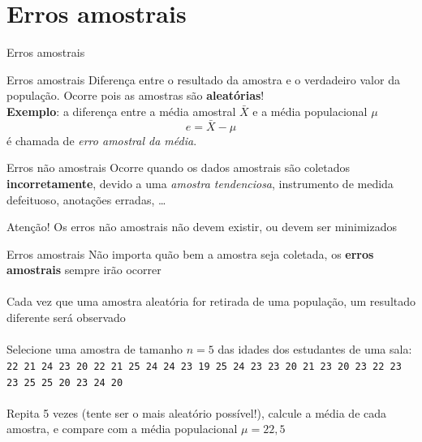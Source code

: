 \documentclass[10pt]{beamer}\usepackage[]{graphicx}\usepackage[]{color}
\theoremstyle{definition}
\begin{document}
\section{Erros amostrais}

\begin{frame}{Erros amostrais}
  \begin{block}{Erros amostrais}
    Diferença entre o resultado da amostra e o verdadeiro valor da
    população. Ocorre pois as amostras são \textbf{aleatórias}! \\
    \textbf{Exemplo}: a diferença entre a média amostral $\bar{X}$ e a
    média populacional $\mu$
    \begin{equation*}
      e = \bar{X} - \mu
    \end{equation*}
    é chamada de \textit{erro amostral da média}.
  \end{block}
  \vspace{1em}
  \begin{block}{Erros não amostrais}
    Ocorre quando os dados amostrais são coletados
    \textbf{incorretamente}, devido a uma \textsl{amostra tendenciosa},
    instrumento de medida defeituoso, anotações erradas, \ldots
  \end{block}
  \pause
  \begin{alertblock}{Atenção!}
    Os erros não amostrais não devem existir, ou devem ser minimizados
  \end{alertblock}
\end{frame}

\begin{frame}{Erros amostrais}
  Não importa quão bem a amostra seja coletada, os \textbf{erros
    amostrais} sempre irão ocorrer\\~\\
  Cada vez que uma amostra aleatória for retirada de uma população, um
  resultado diferente será observado\\~\\
  Selecione uma amostra de tamanho $n = 5$ das idades dos estudantes de
  uma sala: \texttt{22 21 24 23 20 22 21 25 24 24 23 19
    25 24 23 23 20 21 23 20 23
    22 23 23 25 25 20 23 24 20}\\~\\
  Repita 5 vezes (tente ser o mais aleatório possível!), calcule a média
  de cada amostra, e compare com a média populacional $\mu = 22,5$
\end{frame}
\end{document}
